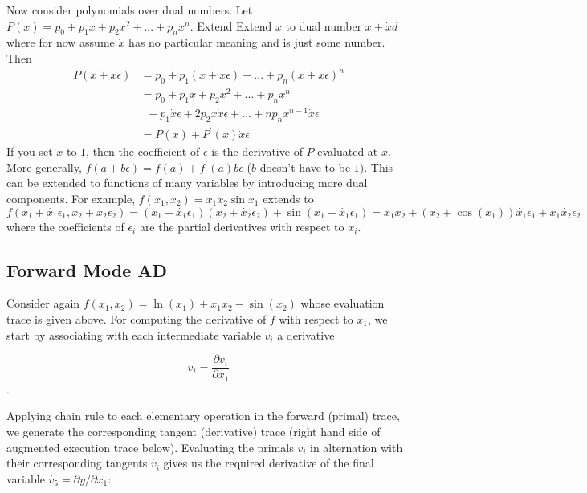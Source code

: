 \documentclass[11pt]{article}
\theoremstyle{definition}
\theoremstyle{plain}
\begin{document}
\noindent Now consider polynomials over dual numbers. Let $P(x)= p_0 + p_1x + p_2x^2 +
... + p_n x^n$. Extend Extend $x$ to dual number $x + \dot{x}d$ where for now
assume $\dot{x}$ has no particular meaning and is just some number. Then
\begin{align*}
    P(x + \dot{x} \epsilon) &= 
        p_0 + p_1(x + \dot{x}\epsilon) + ... + p_n(x + \dot{x}\epsilon)^n\\
    &=  p_0 + p_1x + p_2x^2 + ... + p_n x^n \\
    &\phantom{a} + p_1 \dot{x} \epsilon + 2 p_2 x \dot{x} \epsilon + ... +
        n p_n x^{n-1} \dot{x} \epsilon \\
    &= P(x) + P^\prime(x) \dot{x} \epsilon    
\end{align*}
\noindent If you set $\dot{x}$ to $1$, then the coefficient of $\epsilon$ is
the derivative of $P$ evaluated at $x$. More generally,
$f(a + b \epsilon) = f(a) + f^\prime(a) b \epsilon$ 
($b$ doesn't have to be $1$). This can be extended to functions of many variables
by introducing more dual components. For example, $f(x_1,x_2) = x_1 x_2 \sin x_1$
extends to 
$$f(x_1 + \dot{x_1} \epsilon_1, x_2 + \dot{x_2} \epsilon_2) = 
(x_1 + \dot{x_1}\epsilon_1)(x_2 + \dot{x_2}\epsilon_2) + \sin(x_1 + \dot{x_1}\epsilon_1) =
x_1 x_2 + (x_2 + \cos(x_1))\dot{x_1}\epsilon_1 + x_1 \dot{x_2} \epsilon_2 $$
\noindent where the coefficients of $\epsilon_i$ are the partial derivatives with respect
to $x_i$.

\subsection{Forward Mode AD}

Consider again $f(x_1,x_2) = \ln(x_1) + x_1x_2 - \sin(x_2)$ whose evaluation trace is 
given above. For computing the derivative of $f$ with respect to $x_1$, we 
start by associating with each intermediate variable $v_i$ a derivative

$$ \dot{v_i} = \frac{\partial v_i}{\partial x_1} $$.

\noindent Applying chain rule to each elementary operation in the forward (primal)
trace, we generate the corresponding tangent (derivative) trace (right hand side of
augmented execution trace below). Evaluating the primals $v_i$ in alternation
with their corresponding tangents $\dot{v_i}$ gives us the required derivative
of the final variable $\dot{v_5} = \partial y / \partial x_1$:
\end{document}
